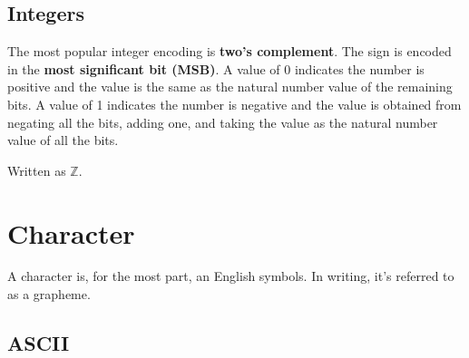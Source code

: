 \subsection{Integers}

The most popular integer encoding is \textbf{two's complement}. The sign is
encoded in the \textbf{most significant bit (MSB)}. A value of 0 indicates the
number is positive and the value is the same as the natural number value of the
remaining bits. A value of 1 indicates the number is negative and the value is
obtained from negating all the bits, adding one, and taking the value as the
natural number value of all the bits.

Written as $\mathbb{Z}$.

\newpage
\section{Character}

A character is, for the most part, an English symbols. In writing, it's referred
to as a grapheme.

\subsection{ASCII}

